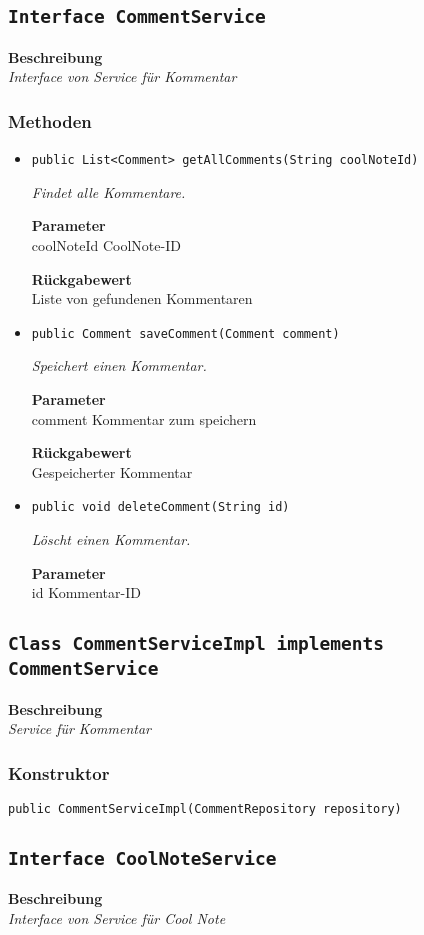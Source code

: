     \subsection{\texttt{Interface CommentService}}
    \textbf{Beschreibung} \\
    \textit{Interface von Service für Kommentar}
    \subsubsection{Methoden}
    \begin{itemize}
    	\item{\texttt{public List<Comment> getAllComments(String coolNoteId)}}
    	
    	\textit{Findet alle Kommentare.}
    	
    	\textbf{Parameter} \\
    	coolNoteId CoolNote-ID
    	
    	\textbf{Rückgabewert} \\
    	Liste von gefundenen Kommentaren        \item{\texttt{public Comment saveComment(Comment comment)}}
    	
    	\textit{Speichert einen Kommentar.}
    	
    	\textbf{Parameter} \\
    	comment Kommentar zum speichern
    	
    	\textbf{Rückgabewert} \\
    	Gespeicherter Kommentar        \item{\texttt{public void deleteComment(String id)}}
    	
    	\textit{Löscht einen Kommentar.}
    	
    	\textbf{Parameter} \\
    	id Kommentar-ID
    	
    	
    \end{itemize}
    \subsection{\texttt{Class CommentServiceImpl implements CommentService}}
    \textbf{Beschreibung} \\
    \textit{Service für Kommentar}
    \subsubsection{Konstruktor}
    \texttt{public CommentServiceImpl(CommentRepository repository)}
    \subsection{\texttt{Interface CoolNoteService}}
    \textbf{Beschreibung} \\
    \textit{Interface von Service für Cool Note}
